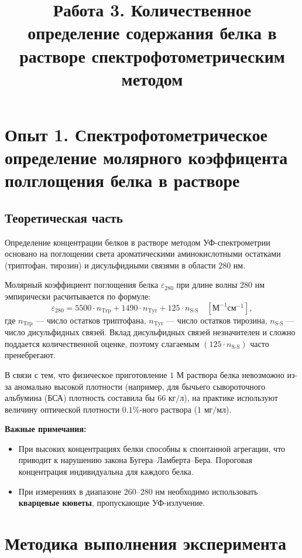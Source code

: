 \documentclass[a4paper,12pt]{article}
\title{\textbf{Работа 3. Количественное определение содержания белка в растворе спектрофотометрическим методом}}\\
\begin{document}
\maketitle

\section*{Опыт 1. Спектрофотометрическое определение молярного коэффицента полглощения белка в растворе}

\subsection*{Теоретическая часть}

Определение концентрации белков в растворе методом УФ-спектрометрии основано на поглощении света ароматическими аминокислотными остатками (триптофан, тирозин) и дисульфидными связями в области $280\text{ нм}$.

Молярный коэффициент поглощения белка $\varepsilon_{280}$ при длине волны $280\text{ нм}$ эмпирически расчитывается по формуле:
\[
\varepsilon_{280} = 5500 \cdot n_{\text{Trp}} + 1490 \cdot n_{\text{Tyr}} + 125 \cdot n_{\text{S-S}} \quad [\text{М}^{-1}\text{см}^{-1}],
\]
где $n_{\text{Trp}}$ — число остатков триптофана, $n_{\text{Tyr}}$ — число остатков тирозина, $n_{\text{S-S}}$ — число дисульфидных связей. Вклад дисульфидных связей незначителен и сложно поддается количественной оценке, поэтому слагаемым $(125 \cdot n_{\text{S-S}})$ часто пренебрегают.

В связи с тем, что физическое приготовление $1\text{ М}$ раствора белка невозможно из-за аномально высокой плотности (например, для бычьего сывороточного альбумина (БСА) плотность составила бы $66\text{ кг/л}$), на практике используют величину оптической плотности $0.1\%$-ного раствора ($1\text{ мг/мл}$).

\textbf{Важные примечания:}
\begin{itemize}
    \item При высоких концентрациях белки способны к спонтанной агрегации, что приводит к нарушению закона Бугера--Ламберта--Бера. Пороговая концентрация индивидуальна для каждого белка.
    \item При измерениях в диапазоне $260$--$280\text{ нм}$ необходимо использовать \textbf{кварцевые кюветы}, пропускающие УФ-излучение.
\end{itemize}

\section*{Методика выполнения эксперимента}
\end{document}
